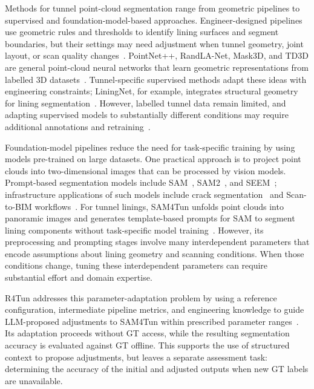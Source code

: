 \documentclass[a4paper,fleqn]{cas-dc}
\begin{document}
{Methods for tunnel point-cloud segmentation range from geometric pipelines to supervised and foundation-model-based approaches. Engineer-designed pipelines use geometric rules and thresholds to identify lining surfaces and segment boundaries, but their settings may need adjustment when tunnel geometry, joint layout, or scan quality changes~\cite{huang2021bim,weidner2024generalized,wang2025automated}. PointNet++, RandLA-Net, Mask3D, and TD3D are general point-cloud neural networks that learn geometric representations from labelled 3D datasets~\cite{qi2017pointnet,hu2020randla,schult2023mask3d,kolodiazhnyi2024td3d}. Tunnel-specific supervised methods adapt these ideas with engineering constraints; LiningNet, for example, integrates structural geometry for lining segmentation~\cite{lin2025liningnet}. However, labelled tunnel data remain limited, and adapting supervised models to substantially different conditions may require additional annotations and retraining~\cite{su2024review, cha2024deep}.

Foundation-model pipelines reduce the need for task-specific training by using models pre-trained on large datasets. One practical approach is to project point clouds into two-dimensional images that can be processed by vision models. Prompt-based segmentation models include SAM~\cite{kirillov2023sam}, SAM2~\cite{ravi2024sam2}, and SEEM~\cite{zou2023segment}; infrastructure applications of such models include crack segmentation~\cite{ge2024cracksam,ye2024sam} and Scan-to-BIM workflows~\cite{wang2024omni,pan2024zero,ye2026maintenance}. For tunnel linings, SAM4Tun unfolds point clouds into panoramic images and generates template-based prompts for SAM to segment lining components without task-specific model training~\cite{ye2025sam4tun}. However, its preprocessing and prompting stages involve many interdependent parameters that encode assumptions about lining geometry and scanning conditions. When those conditions change, tuning these interdependent parameters can require substantial effort and domain expertise.

R4Tun addresses this parameter-adaptation problem by using a reference configuration, intermediate pipeline metrics, and engineering knowledge to guide LLM-proposed adjustments to SAM4Tun within prescribed parameter ranges~\cite{taoR4Tun}. Its adaptation proceeds without GT access, while the resulting segmentation accuracy is evaluated against GT offline. This supports the use of structured context to propose adjustments, but leaves a separate assessment task: determining the accuracy of the initial and adjusted outputs when new GT labels are unavailable.

}
\end{document}
